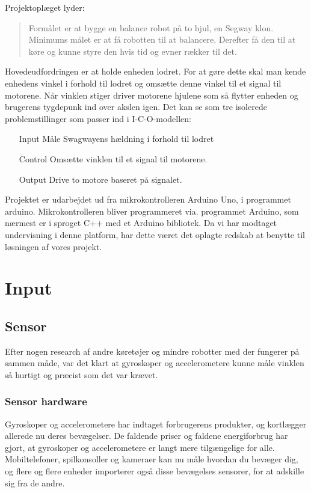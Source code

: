 \documentclass[a4paper,oneside,article,danish,table]{memoir}
\begin{document}
Projektoplæget lyder:
\begin{quote}
  Formålet er at bygge en balance robot på to hjul, en Segway klon. Minimums målet er at få robotten til at balancere. Derefter få den til at køre og kunne styre den hvis tid og evner rækker til det.
\end{quote}

Hovedeudfordringen er at holde enheden lodret. For at gøre dette skal man kende enhedens vinkel i forhold til lodret og omsætte denne vinkel til et signal til motorene. Når vinklen stiger driver motorene hjulene som så flytter enheden og brugerens tygdepunk ind over akslen igen.
Det kan se som tre isolerede problemstillinger som passer ind i I-C-O-modellen:
\begin{itemize}
\item[Input] Måle Swagwayens hældning i forhold til lodret
\item[Control] Omsætte vinklen til et signal til motorene.
\item[Output] Drive to motore baseret på signalet.
\end{itemize}

Projektet er udarbejdet ud fra mikrokontrolleren Arduino Uno, i programmet arduino. Mikrokontrolleren bliver programmeret via. programmet Arduino, som nærmest er i sproget C++ med et Arduino bibliotek. Da vi har modtaget undervisning i denne platform, har dette været det oplagte redskab at benytte til løsningen af vores projekt.

\chapter{Input}
\section{Sensor}
Efter nogen research af andre køretøjer og mindre robotter med der fungerer på sammen måde, var det klart at gyroskoper og accelerometere kunne måle vinklen så hurtigt og præcist som det var krævet.
\subsection{Sensor hardware}
Gyroskoper og accelerometere har indtaget forbrugerens produkter, og kortlægger allerede nu deres bevægelser. De faldende priser og faldene energiforbrug har gjort, at gyroskoper og accelerometere er langt mere tilgængelige for alle. Mobiltelefoner, spilkonsoller og kameraer kan nu måle hvordan du bevæger dig, og flere og flere enheder importerer også disse bevægelses sensorer, for at adskille sig fra de andre.
\end{document}
